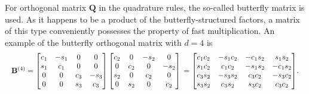 For orthogonal matrix $\mathbf{Q}$ in the quadrature rules, the so-called butterfly matrix is used.
As it happens to be a product of the butterfly-structured factors, a matrix of this type conveniently possesses the property of fast multiplication. An example of the butterfly orthogonal matrix with $d = 4$ is
\begin{equation*}\resizebox{.99\hsize}{!}{$
    \mathbf{B}^{(4)} =
    \begin{bmatrix}
        c_1 & -s_1 & 0 & 0 \\
        s_1 & c_1 & 0 & 0 \\
        0 & 0 & c_3 & -s_3 \\
        0 & 0 & s_3 & c_3 \\
    \end{bmatrix}
    \begin{bmatrix}
        c_2 & 0 & -s_2 & 0 \\
        0 & c_2 & 0 & -s_2 \\
        s_2 & 0 & c_2 & 0 \\
        0 & s_2 & 0 & c_2 \\
    \end{bmatrix}\\
    =
    \begin{bmatrix}
        c_1c_2 & -s_1c_2 & -c_1s_2 & s_1s_2 \\
        s_1c_2 & c_1c_2 & -s_1s_2 & -c_1s_2 \\
        c_3s_2 & -s_3s_2 & c_3c_2 & -s_3c_2 \\
        s_3s_2 & c_3s_2 & s_3c_2 & c_3c_2 \\
    \end{bmatrix}$}.
\end{equation*}

